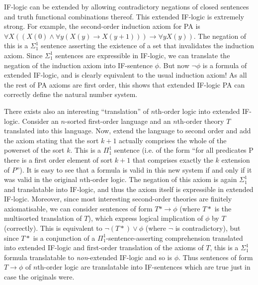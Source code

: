 \documentclass[12pt]{article}
\begin{document}
IF-logic can be extended by allowing contradictory negations of closed sentences and truth functional combinations thereof. This extended IF-logic is extremely strong. For example, the second-order induction axiom for PA is $\forall X( (X(0) \wedge \forall y( X(y) \rightarrow X(y+1))) \rightarrow \forall y X(y))$. The negation of this is a $\Sigma^1_1$ sentence asserting the existence of a set that invalidates the induction axiom. Since $\Sigma^1_1$ sentences are expressible in IF-logic, we can translate the negation of the induction axiom into IF-sentence $\phi$. But now $\neg\phi$ is a formula of extended IF-logic, and is clearly equivalent to the usual induction axiom! As all the rest of PA axioms are first order, this shows that extended IF-logic PA can correctly define the natural number system.

There exists also an interesting ``translation'' of $n$th-order logic into extended IF-logic. Consider an $n$-sorted first-order language and an $n$th-order theory $T$ translated into this language. Now, extend the language to second order and add the axiom stating that the sort $k+1$ actually comprises the whole of the powerset of the sort $k$. This is a $\Pi^1_1$ sentence (i.e. of the form ``for all predicates P there is a first order element of sort $k+1$ that comprises exactly the $k$ extension of $P$''). It is easy to see that a formula is valid in this new system if and only if it was valid in the original $n$th-order logic. The negation of this axiom is again $\Sigma^1_1$ and translatable into IF-logic, and thus the axiom itself is expressible in extended IF-logic. Moreover, since most interesting second-order theories are finitely axiomatisable, we can consider sentences of form $T*\rightarrow\phi$ (where $T*$ is the multisorted translation of $T$), which express logical implication of $\phi$ by $T$ (correctly). This is equivalent to $\neg (T*) \vee \phi$ (where $\neg$ is contradictory), but since $T*$ is a conjunction of a $\Pi^1_1$-sentence-asserting comprehension translated into extended IF-logic and first-order translation of the axioms of $T$, this is a $\Sigma_1^1$ formula translatable to {\em non}-extended IF-logic and so is $\phi$. Thus sentences of form $T \rightarrow \phi$ of $n$th-order logic are translatable into IF-sentences which are true just in case the originals were.
\end{document}
